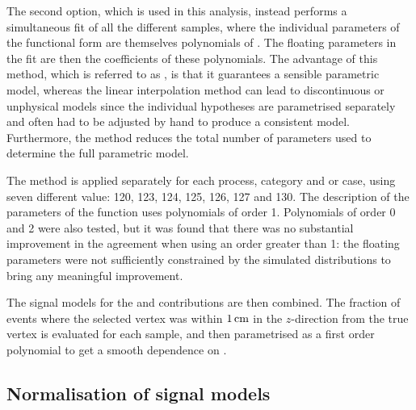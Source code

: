 The second option, which is used in this analysis, instead performs a simultaneous fit of all the different \mH samples, where the individual parameters of the functional form are themselves polynomials of \mH. %
The floating parameters in the fit are then the coefficients of these polynomials. %
The advantage of this method, which is referred to as \SSF, is that it guarantees a sensible parametric model, whereas the linear interpolation method can lead to discontinuous or unphysical models since the individual \mH hypotheses are parametrised separately and often had to be adjusted by hand to produce a consistent model. 
Furthermore, the \SSF method reduces the total number of parameters used to determine the full parametric model.

The \SSF method is applied separately for each process, category and \RV or \WV case, using seven different \mH value: 120, 123, 124, 125, 126, 127 and 130\GeV. The description of the parameters of the \DCBpG function uses polynomials of order 1. Polynomials of order 0 and 2 were also tested, but it was found that there was no substantial improvement in the agreement when using an order greater than 1: the floating parameters were not sufficiently constrained by the simulated \mgg distributions to bring any meaningful improvement.

The signal models for the \RV and \WV contributions are then combined. %
The fraction of events where the selected vertex was within $1\,\text{cm}$ in the $z$-direction from the true vertex is evaluated for each \mH sample, and then parametrised as a first order polynomial to get a smooth dependence on \mH. 


\subsection{Normalisation of signal models}


